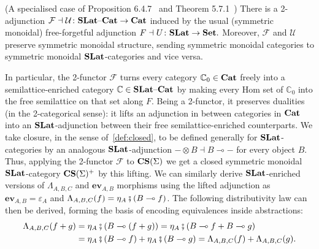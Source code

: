 \begin{proposition}(A specialised case of Proposition 6.4.7~\cite{Borceux_1994} and Theorem 5.7.1~\cite{cruttwell2008normed})
	There is a 2-adjunction
	\(
	\mathcal{F} \dashv \mathcal{U}\colon \mathbf{SLat}\text{--}\mathbf{Cat} \to \mathbf{Cat}
	\)
	induced by the usual (symmetric monoidal) free-forgetful adjunction
	\(
	F \dashv U\colon \mathbf{SLat} \to \mathbf{Set}.
	\)
	Moreover, $\mathcal{F}$ and $\mathcal{U}$ preserve symmetric monoidal structure, sending symmetric monoidal categories to symmetric monoidal $\mathbf{SLat}$-categories and vice versa.
\end{proposition}
In particular, the 2-functor $\mathcal{F}$ turns every category $\mathbb{C}_0 \in \mathbf{Cat}$ freely into a semilattice-enriched category $\mathbb{C} \in \mathbf{SLat}\text{--}\mathbf{Cat}$ by making every Hom set of $\mathbb{C}_0$ into the free semilattice on that set along $F$.
Being a 2-functor, it preserves dualities (in the 2-categorical sense): it lifts an adjunction in between categories in $\mathbf{Cat}$ into an $\mathbf{SLat}$-adjunction between their free semilattice-enriched counterparts.
We take closure, in the sense of~\autoref{def:closed}, to be defined generally for $\mathbf{SLat}$-categories by an analogous $\mathbf{SLat}$-adjunction $- \otimes B \dashv B \multimap -$ for every object $B$.
Thus, applying the 2-functor $\mathcal{F}$ to $\mathbf{CS}(\Sigma)$ we get a closed symmetric monoidal $\mathbf{SLat}$-category $\mathbf{CS}(\Sigma)^{+}$ by this lifting.
We can similarly derive $\mathbf{SLat}$-enriched versions of  $\Lambda_{A,B,C}$ and $\textbf{ev}_{A,B}$ morphisms using the lifted adjunction as $\textbf{ev}_{A,B} = \varepsilon_{A}$ and $\Lambda_{A,B,C}(f) = \eta_A \fatsemi (B \multimap{} f)$.
The following distributivity law can then be derived, forming the basis of encoding equivalences inside abstractions:
\begin{equation}
	\begin{aligned}
		\Lambda_{A,B,C}(f + g)  &= \eta_A \fatsemi (B \multimap (f + g))                    
		                        = \eta_A \fatsemi (B \multimap f + B \multimap g)\\          
		                        &= \eta_A \fatsemi (B \multimap f) + \eta_A \fatsemi (B \multimap g) 
		                        = \Lambda_{A,B,C}(f) + \Lambda_{A,B,C}(g).
	\end{aligned}%
	\label{law:distributivity}
\end{equation}

